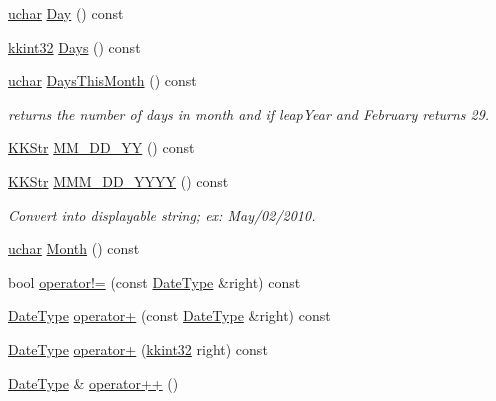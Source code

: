 \begin{DoxyCompactItemize}
\item 
\hyperlink{namespace_k_k_b_ace9969169bf514f9ee6185186949cdf7}{uchar} \hyperlink{class_k_k_b_1_1_date_type_a2a73547523a2043033732bec07afdd06}{Day} () const 
\item 
\hyperlink{namespace_k_k_b_a8fa4952cc84fda1de4bec1fbdd8d5b1b}{kkint32} \hyperlink{class_k_k_b_1_1_date_type_aa9e8ab2449893e84916ecddadee88428}{Days} () const 
\item 
\hyperlink{namespace_k_k_b_ace9969169bf514f9ee6185186949cdf7}{uchar} \hyperlink{class_k_k_b_1_1_date_type_a79a10dc9f9945e9211714dd8c99d454c}{Days\+This\+Month} () const 
\begin{DoxyCompactList}\small\item\em returns the number of days in \textquotesingle{}month\textquotesingle{} and if leap\+Year and February returns 29. \end{DoxyCompactList}\item 
\hyperlink{class_k_k_b_1_1_k_k_str}{K\+K\+Str} \hyperlink{class_k_k_b_1_1_date_type_a11fb8ec9b212f4b0ca57e8d46f0de910}{M\+M\+\_\+\+D\+D\+\_\+\+YY} () const 
\item 
\hyperlink{class_k_k_b_1_1_k_k_str}{K\+K\+Str} \hyperlink{class_k_k_b_1_1_date_type_a67ba57258bcab44f6780587342abefe0}{M\+M\+M\+\_\+\+D\+D\+\_\+\+Y\+Y\+YY} () const 
\begin{DoxyCompactList}\small\item\em Convert into displayable string; ex\+: May/02/2010. \end{DoxyCompactList}\item 
\hyperlink{namespace_k_k_b_ace9969169bf514f9ee6185186949cdf7}{uchar} \hyperlink{class_k_k_b_1_1_date_type_a2ed203f7e120b49cd5fb994613b5c9a2}{Month} () const 
\item 
bool \hyperlink{class_k_k_b_1_1_date_type_a967721fb08002bce283668cc725dc83a}{operator!=} (const \hyperlink{class_k_k_b_1_1_date_type}{Date\+Type} \&right) const 
\item 
\hyperlink{class_k_k_b_1_1_date_type}{Date\+Type} \hyperlink{class_k_k_b_1_1_date_type_a47f6011271dc6228bb27575ec2092133}{operator+} (const \hyperlink{class_k_k_b_1_1_date_type}{Date\+Type} \&right) const 
\item 
\hyperlink{class_k_k_b_1_1_date_type}{Date\+Type} \hyperlink{class_k_k_b_1_1_date_type_abe3bed4298ff0ade5fc3ff3df152a8e4}{operator+} (\hyperlink{namespace_k_k_b_a8fa4952cc84fda1de4bec1fbdd8d5b1b}{kkint32} right) const 
\item 
\hyperlink{class_k_k_b_1_1_date_type}{Date\+Type} \& \hyperlink{class_k_k_b_1_1_date_type_a1672c2204ac3374e1860d9465fae85aa}{operator++} ()

\end{DoxyCompactItemize}
